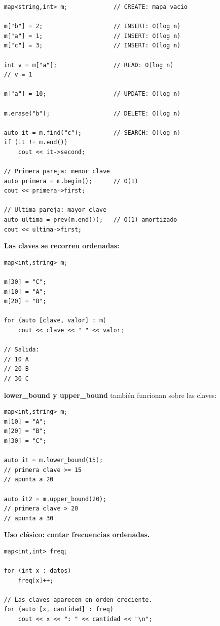 \documentclass[10pt,a4paper,twocolumn]{article}
\begin{document}
\begin{lstlisting}[style=cpp]
map<string,int> m;             // CREATE: mapa vacio

m["b"] = 2;                    // INSERT: O(log n)
m["a"] = 1;                    // INSERT: O(log n)
m["c"] = 3;                    // INSERT: O(log n)

int v = m["a"];                // READ: O(log n)
// v = 1

m["a"] = 10;                   // UPDATE: O(log n)

m.erase("b");                  // DELETE: O(log n)

auto it = m.find("c");         // SEARCH: O(log n)
if (it != m.end())
    cout << it->second;

// Primera pareja: menor clave
auto primera = m.begin();      // O(1)
cout << primera->first;

// Ultima pareja: mayor clave
auto ultima = prev(m.end());   // O(1) amortizado
cout << ultima->first;
\end{lstlisting}

\textbf{Las claves se recorren ordenadas:}

\begin{lstlisting}[style=cpp]
map<int,string> m;

m[30] = "C";
m[10] = "A";
m[20] = "B";

for (auto [clave, valor] : m)
    cout << clave << " " << valor;

// Salida:
// 10 A
// 20 B
// 30 C
\end{lstlisting}

\textbf{lower\_bound y upper\_bound} también funcionan sobre las claves:

\begin{lstlisting}[style=cpp]
map<int,string> m;
m[10] = "A";
m[20] = "B";
m[30] = "C";

auto it = m.lower_bound(15);
// primera clave >= 15
// apunta a 20

auto it2 = m.upper_bound(20);
// primera clave > 20
// apunta a 30
\end{lstlisting}

\textbf{Uso clásico: contar frecuencias ordenadas.}

\begin{lstlisting}[style=cpp]
map<int,int> freq;

for (int x : datos)
    freq[x]++;

// Las claves aparecen en orden creciente.
for (auto [x, cantidad] : freq)
    cout << x << ": " << cantidad << "\n";
\end{lstlisting}
\end{document}
